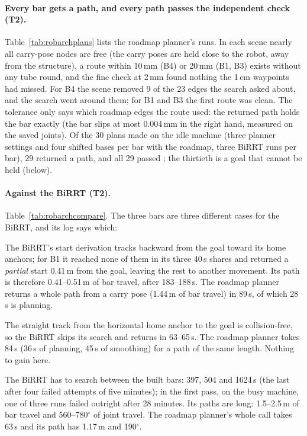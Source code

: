 \paragraph{Every bar gets a path, and every path passes the independent check (T2).}
Table~\ref{tab:robarchplans} lists the roadmap planner's runs. In each scene nearly
all carry-pose nodes are free (the carry poses are held close to the robot, away
from the structure), a route within 10\,mm (B4) or 20\,mm (B1, B3) exists without any
tube round, and the fine check at 2\,mm found nothing the 1\,cm waypoints had
missed. For B4 the scene removed 9 of the 23 edges the search asked about, and the
search went around them; for B1 and B3 the first route was clean. The tolerance
only says which roadmap edges the route used: the returned path holds the bar
exactly (the bar slips at most 0.004\,mm in the right hand, measured on the saved
joints). Of the 30 plans made on the idle machine (three planner settings and four
shifted bases per bar with the roadmap, three BiRRT runs per bar), 29 returned a
path, and all 29 passed ; the thirtieth is a goal that
cannot be held (below).

\paragraph{Against the BiRRT (T2).} Table~\ref{tab:robarchcompare}. The three bars
are three different cases for the BiRRT, and its log says which:
\begin{description}[nosep,leftmargin=1.5em]
  \item[B1] The BiRRT's start derivation tracks backward from the goal toward its
        home anchors; for B1 it reached none of them in its three 40\,s shares and
        returned a \emph{partial} start 0.41\,m from the goal, leaving the rest to
        another movement. Its path is therefore 0.41--0.51\,m of bar travel, after
        183--188\,s. The roadmap planner returns a whole path from a carry pose
        (1.44\,m of bar travel) in 89\,s, of which 28\,s is planning.
  \item[B3] The straight track from the horizontal home anchor to the goal is
        collision-free, so the BiRRT skips its search and returns in 63--65\,s. The
        roadmap planner takes 84\,s (36\,s of planning, 45\,s of smoothing) for a
        path of the same length. Nothing to gain here.
  \item[B4] The BiRRT has to search between the built bars: 397, 504 and
        1624\,s (the last after four failed attempts of five minutes); in the
        first pass, on the busy machine, one of three runs failed outright after
        28 minutes. Its paths are long: 1.5--2.5\,m of bar travel and
        560--780$^\circ$ of joint travel. The roadmap planner's whole call takes
        63\,s and its path has 1.17\,m and 190$^\circ$.
\end{description}

